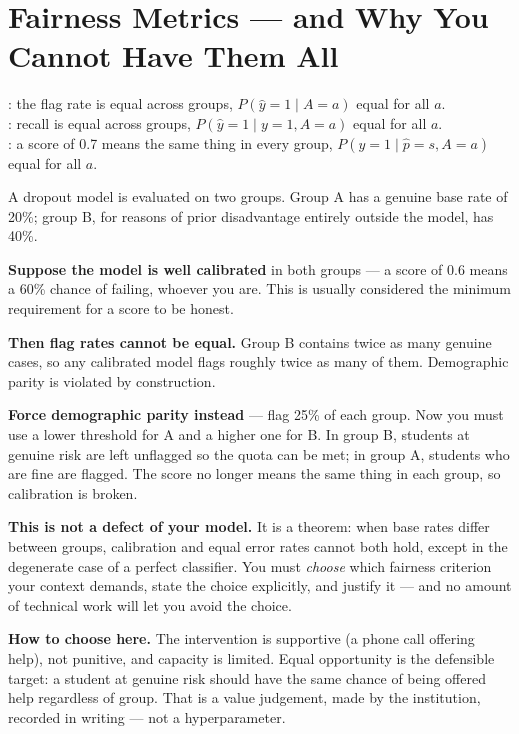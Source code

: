 \section{Fairness Metrics --- and Why You Cannot Have Them All}

\begin{definitionbox}
: the flag rate is equal across groups,
$P(\hat{y}=1 \mid A{=}a)$ equal for all $a$.\\[2pt]
: recall is equal across groups,
$P(\hat{y}=1 \mid y{=}1, A{=}a)$ equal for all $a$.\\[2pt]
: a score of 0.7 means the same thing in every group,
$P(y{=}1 \mid \hat{p}{=}s, A{=}a)$ equal for all $a$.
\end{definitionbox}

\begin{worked}
A dropout model is evaluated on two groups. Group A has a genuine base rate of 20\%;
group B, for reasons of prior disadvantage entirely outside the model, has 40\%.

\smallskip
\textbf{Suppose the model is well calibrated} in both groups --- a score of 0.6
means a 60\% chance of failing, whoever you are. This is usually considered the
minimum requirement for a score to be honest.

\smallskip
\textbf{Then flag rates cannot be equal.} Group B contains twice as many genuine
cases, so any calibrated model flags roughly twice as many of them. Demographic
parity is violated by construction.

\smallskip
\textbf{Force demographic parity instead} --- flag 25\% of each group. Now you must
use a lower threshold for A and a higher one for B. In group B, students at genuine
risk are left unflagged so the quota can be met; in group A, students who are fine
are flagged. The score no longer means the same thing in each group, so calibration
is broken.

\smallskip
\textbf{This is not a defect of your model.} It is a theorem: when base rates differ
between groups, calibration and equal error rates cannot both hold, except in the
degenerate case of a perfect classifier. You must \emph{choose} which fairness
criterion your context demands, state the choice explicitly, and justify it --- and
no amount of technical work will let you avoid the choice.

\smallskip
\textbf{How to choose here.} The intervention is supportive (a phone call offering
help), not punitive, and capacity is limited. Equal opportunity is the defensible
target: a student at genuine risk should have the same chance of being offered help
regardless of group. That is a value judgement, made by the institution, recorded in
writing --- not a hyperparameter.
\end{worked}

